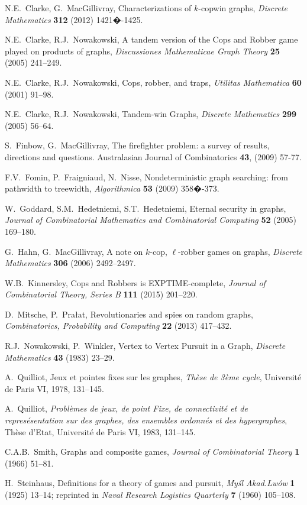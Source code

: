 \documentclass[12pt,reqno]{amsart}
\begin{document}
\begin{thebibliography}{99}
 N.E.\ Clarke, G.\ MacGillivray, Characterizations of $k$-copwin graphs, \emph{Discrete Mathematics} \textbf{312} (2012) 1421�-1425.

 N.E.\ Clarke, R.J.\ Nowakowski, A tandem version of the Cops and Robber game played on products of graphs, \emph{Discussiones Mathematicae Graph Theory} \textbf{25} (2005) 241--249.

 N.E.\ Clarke, R.J.\ Nowakowski, Cops, robber, and traps, \emph{Utilitas Mathematica} \textbf{60} (2001) 91--98.

 N.E.\ Clarke, R.J.\ Nowakowski, Tandem-win Graphs, {\em Discrete Mathematics} {\bf 299} (2005) 56--64.

 S.\ Finbow, G.\ MacGillivray,
The firefighter problem: a survey of results, directions and
questions. Australasian Journal of Combinatorics \textbf{43}, (2009) 57-77.

 F.V.\ Fomin, P.\ Fraigniaud, N.\ Nisse, Nondeterministic graph searching: from pathwidth to treewidth, \emph{Algorithmica} \textbf{53} (2009) 358�-373.

 W.\ Goddard, S.M.\ Hedetniemi, S.T.\ Hedetniemi, Eternal security in graphs, \emph{Journal of Combinatorial Mathematics and Combinatorial Computing} \textbf{52} (2005) 169--180.

 G.\ Hahn, G.\ MacGillivray, A note on $k$-cop, $\ell$-robber games on graphs, \emph{Discrete Mathematics} \textbf{306} (2006)
2492--2497.

 W.B.\ Kinnersley, Cops and Robbers is EXPTIME-complete, \emph{Journal of Combinatorial Theory, Series B} \textbf{111} (2015) 201--220.

 D.\ Mitsche, P.\ Pra\l{}at, Revolutionaries and spies on random graphs, \emph{Combinatorics, Probability and Computing} \textbf{22} (2013) 417--432.

 R.J.\ Nowakowski, P.\ Winkler, Vertex to Vertex Pursuit in a Graph, {\em Discrete Mathematics} \textbf{43} (1983) 23--29.

 A.\ Quilliot, Jeux et pointes fixes sur les graphes, \emph{Th\`{e}se de 3\`{e}me cycle}, Universit\'{e} de Paris VI, 1978, 131--145.

 A.\ Quilliot, \emph{Probl\`{e}mes de jeux, de point Fixe, de connectivit\'{e} et de repres\'{e}sentation sur des graphes, des ensembles ordonn\'{e}s et des hypergraphes}, Th\`{e}se
    d'Etat, Universit\'{e} de Paris VI, 1983, 131--145.

 C.A.B.\ Smith, Graphs and composite games, \emph{Journal of Combinatorial Theory} \textbf{1} (1966) 51--81.

 H.\ Steinhaus, Definitions for a theory of games and pursuit, \emph{My\'{s}l Akad.Lw\'{o}w} \textbf{1} (1925) 13--14;  reprinted in \emph{Naval Research Logistics Quarterly}
    \textbf{7} (1960) 105--108.

\end{thebibliography}
\end{document}
